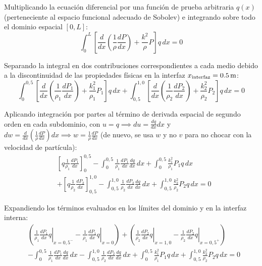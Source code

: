 \documentclass[11pt,letterpaper]{article}
\begin{document}
Multiplicando la ecuación diferencial por una función de prueba arbitraria $q(x)$ (perteneciente al espacio funcional adecuado de Sobolev) e integrando sobre todo el dominio espacial $[0, L]$:
\begin{equation}
    \int_0^L \left[ \frac{d}{dx} \left( \frac{1}{\rho} \frac{dP}{dx} \right) + \frac{k^2}{\rho} P \right] q \, dx = 0
\end{equation}

Separando la integral en dos contribuciones correspondientes a cada medio debido a la discontinuidad de las propiedades físicas en la interfaz $x_{\text{interfaz}} = \text{\qty{0,5}{\metre}}$:
\begin{equation}
    \int_0^{0{,}5} \left[ \frac{d}{dx} \left( \frac{1}{\rho_1} \frac{dP_1}{dx} \right) + \frac{k_1^2}{\rho_1} P_1 \right] q \, dx + \int_{0{,}5}^{1{,}0} \left[ \frac{d}{dx} \left( \frac{1}{\rho_2} \frac{dP_2}{dx} \right) + \frac{k_2^2}{\rho_2} P_2 \right] q \, dx = 0
\end{equation}

Aplicando integración por partes al término de derivada espacial de segundo orden en cada subdominio, con $u = q \implies du = \frac{dq}{dx}dx$ y $dw = \frac{d}{dx}\left(\frac{1}{\rho}\frac{dP}{dx}\right)dx \implies w = \frac{1}{\rho}\frac{dP}{dx}$ (de nuevo, se usa $w$ y no $v$ para no chocar con la velocidad de partícula):
\begin{align}
    &\left[ q \frac{1}{\rho_1} \frac{dP_1}{dx} \right]_0^{0{,}5} - \int_0^{0{,}5} \frac{1}{\rho_1} \frac{dP_1}{dx} \frac{dq}{dx} \, dx + \int_0^{0{,}5} \frac{k_1^2}{\rho_1} P_1 q \, dx \nonumber \\
    &+ \left[ q \frac{1}{\rho_2} \frac{dP_2}{dx} \right]_{0{,}5}^{1{,}0} - \int_{0{,}5}^{1{,}0} \frac{1}{\rho_2} \frac{dP_2}{dx} \frac{dq}{dx} \, dx + \int_{0{,}5}^{1{,}0} \frac{k_2^2}{\rho_2} P_2 q \, dx = 0
\end{align}

Expandiendo los términos evaluados en los límites del dominio y en la interfaz interna:
\begin{align}
    &\left( \left. \frac{1}{\rho_1} \frac{dP_1}{dx} q \right|_{x=0{,}5^-} - \left. \frac{1}{\rho_1} \frac{dP_1}{dx} q \right|_{x=0} \right) + \left( \left. \frac{1}{\rho_2} \frac{dP_2}{dx} q \right|_{x=1{,}0} - \left. \frac{1}{\rho_2} \frac{dP_2}{dx} q \right|_{x=0{,}5^+} \right) \nonumber \\
    &- \int_0^{0{,}5} \frac{1}{\rho_1} \frac{dP_1}{dx} \frac{dq}{dx} \, dx - \int_{0{,}5}^{1{,}0} \frac{1}{\rho_2} \frac{dP_2}{dx} \frac{dq}{dx} \, dx + \int_0^{0{,}5} \frac{k_1^2}{\rho_1} P_1 q \, dx + \int_{0{,}5}^{1{,}0} \frac{k_2^2}{\rho_2} P_2 q \, dx = 0
\end{align}
\end{document}

